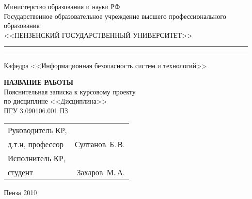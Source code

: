 \newpage
\begin{center}
  \begin{singlespace}
    Министерство образования и науки РФ  \\
    Государственное образовательное учреждение высшего профессионального образования \\
    \vspace{0.25cm}
    <<ПЕНЗЕНСКИЙ ГОСУДАРСТВЕННЫЙ УНИВЕРСИТЕТ>> \\
    \medskip 
    \hrule height 1pt
    \vskip 1pt 
    \hrule
    \vskip 3pt
    Кафедра <<Информационная безопасность систем и технологий>>
  \end{singlespace}

  \vspace{8em}

  \textsc{\textbf{НАЗВАНИЕ РАБОТЫ}}\\[0.5cm]

  Пояснительная записка к курсовому проекту \\
  по дисциплине <<Дисциплина>>\\[0.5cm]

  ПГУ 3.090106.001 ПЗ

  \vspace{8em}

  \begin{tabular}[h]{p{7cm}r}
    Руководитель КР,  & \\
    д.т.н, профессор & \underline{\hspace{3cm}}Султанов~Б.\,В.\\
    Исполнитель КР,  & \\
    студент & \underline{\hspace{3cm}}Захаров~М.\,А.
  \end{tabular}

  \vspace{\fill}

  Пенза 2010

\end{center}
\newpage
